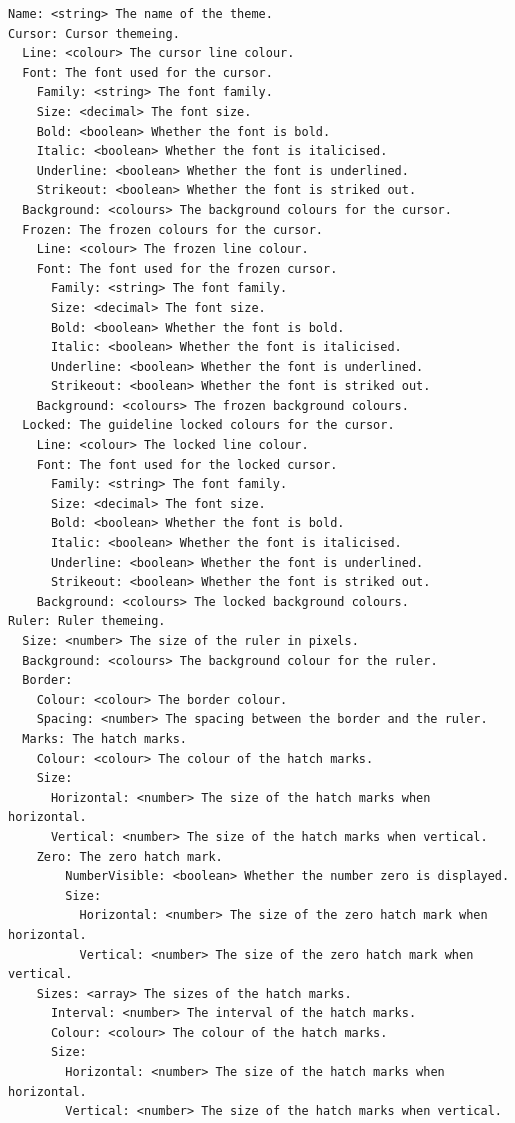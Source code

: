 \documentclass[
]{book}
\begin{document}
\begin{verbatim}
Name: <string> The name of the theme.
Cursor: Cursor themeing.
  Line: <colour> The cursor line colour.
  Font: The font used for the cursor.
    Family: <string> The font family.
    Size: <decimal> The font size.
    Bold: <boolean> Whether the font is bold.
    Italic: <boolean> Whether the font is italicised.
    Underline: <boolean> Whether the font is underlined.
    Strikeout: <boolean> Whether the font is striked out.
  Background: <colours> The background colours for the cursor.
  Frozen: The frozen colours for the cursor.
    Line: <colour> The frozen line colour.
    Font: The font used for the frozen cursor.
      Family: <string> The font family.
      Size: <decimal> The font size.
      Bold: <boolean> Whether the font is bold.
      Italic: <boolean> Whether the font is italicised.
      Underline: <boolean> Whether the font is underlined.
      Strikeout: <boolean> Whether the font is striked out.
    Background: <colours> The frozen background colours.
  Locked: The guideline locked colours for the cursor.
    Line: <colour> The locked line colour.
    Font: The font used for the locked cursor.
      Family: <string> The font family.
      Size: <decimal> The font size.
      Bold: <boolean> Whether the font is bold.
      Italic: <boolean> Whether the font is italicised.
      Underline: <boolean> Whether the font is underlined.
      Strikeout: <boolean> Whether the font is striked out.
    Background: <colours> The locked background colours.
Ruler: Ruler themeing.
  Size: <number> The size of the ruler in pixels.
  Background: <colours> The background colour for the ruler.
  Border:
    Colour: <colour> The border colour.
    Spacing: <number> The spacing between the border and the ruler.
  Marks: The hatch marks.
    Colour: <colour> The colour of the hatch marks.
    Size:
      Horizontal: <number> The size of the hatch marks when horizontal.
      Vertical: <number> The size of the hatch marks when vertical.
    Zero: The zero hatch mark.
        NumberVisible: <boolean> Whether the number zero is displayed.
        Size:
          Horizontal: <number> The size of the zero hatch mark when horizontal.
          Vertical: <number> The size of the zero hatch mark when vertical.
    Sizes: <array> The sizes of the hatch marks.
      Interval: <number> The interval of the hatch marks.
      Colour: <colour> The colour of the hatch marks.
      Size:
        Horizontal: <number> The size of the hatch marks when horizontal.
        Vertical: <number> The size of the hatch marks when vertical.

\end{verbatim}
\end{document}
